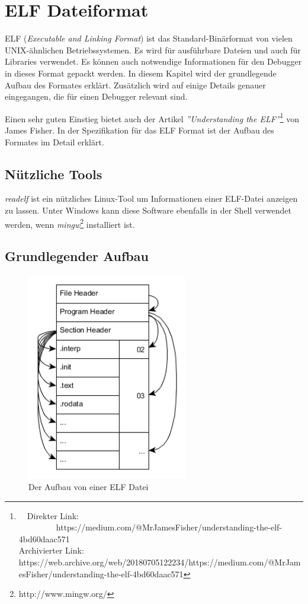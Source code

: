 \chapter{ELF Dateiformat}
ELF (\textit{Executable and Linking Format}) ist das Standard-Binärformat von vielen UNIX-ähnlichen Betriebssystemen.
Es wird für ausführbare Dateien und auch für Libraries verwendet.
Es können auch notwendige Informationen für den Debugger in dieses Format gepackt werden.
In diesem Kapitel wird der grundlegende Aufbau des Formates erklärt.
Zusätzlich wird auf einige Details genauer eingegangen, die für einen Debugger relevant sind.

Einen sehr guten Einstieg bietet auch der Artikel \textit{''Understanding the ELF''}\footnote{\ \ Direkter Link: \ \ \ \ \ \ \ \ \ https://medium.com/@MrJamesFisher/understanding-the-elf-4bd60daac571\\ Archivierter Link: https://web.archive.org/web/20180705122234/https://medium.com/@MrJamesFisher/understanding-the-elf-4bd60daac571} von James Fisher.
In der Spezifikation für das ELF Format\cite{bib:ELFSpecification} ist der Aufbau des Formates im Detail erklärt.


\section{Nützliche Tools}
\textit{readelf} ist ein nützliches Linux-Tool um Informationen einer ELF-Datei anzeigen zu lassen.
Unter Windows kann diese Software ebenfalls in der Shell verwendet werden, wenn \textit{mingw}\footnote{http://www.mingw.org/} installiert ist.

\section{Grundlegender Aufbau}
\begin{figure}[htbp]
	\centering
		\includegraphics[width=7cm,keepaspectratio]{graphs/elf.png}
	\caption[Der Aufbau von einer ELF Datei]{Der Aufbau von einer ELF Datei\footnotemark}
	\label{fig:ELFStructure}
\end{figure}

